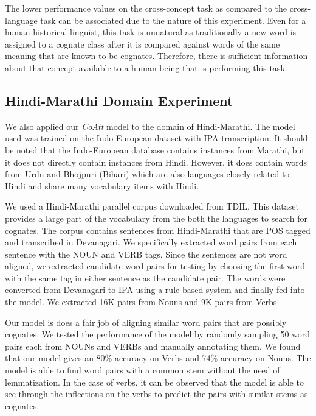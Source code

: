 \documentclass[11pt,letterpaper]{article}
\begin{document}
The lower performance values on the cross-concept task as compared to the cross-language task can be associated due to the nature of this experiment.  Even for a human historical linguist, this task is unnatural as traditionally a new word is assigned to a cognate class after it is compared against words of the same meaning that are known to be cognates. Therefore, there is sufficient information about that concept available to a human being that is performing this task. 

\subsection{Hindi-Marathi Domain Experiment}

We also applied our \textit{CoAtt} model to the domain of Hindi-Marathi. The model used was trained on the Indo-European dataset with IPA transcription. It should be noted that the Indo-European database contains instances from Marathi, but it does not directly contain instances from Hindi. However, it does contain words from Urdu and Bhojpuri (Bihari) which are also languages closely related to Hindi and share many vocabulary items with Hindi.

We used a Hindi-Marathi parallel corpus downloaded from TDIL. This dataset provides a large part of the vocabulary from the both the languages to search for cognates. The corpus contains sentences from Hindi-Marathi that are POS tagged and transcribed in Devanagari. We specifically extracted word pairs from each sentence with the NOUN and VERB tags. Since the sentences are not word aligned, we extracted candidate word pairs for testing by choosing the first word with the same tag in either sentence as the candidate pair. The words were converted from Devanagari to IPA using a rule-based system and finally fed into the model. We extracted 16K pairs from Nouns and 9K pairs from Verbs.

Our model is does a fair job of aligning similar word pairs that are possibly cognates. We tested the performance of the model by randomly sampling 50 word pairs each from NOUNs and VERBs and manually annotating them. We found that our model gives an 80\% accuracy on Verbs and 74\% accuracy on Nouns. The model is able to find word pairs with a common stem without the need of lemmatization. In the case of verbs, it can be observed that the model is able to see through the inflections on the verbs to predict the pairs with similar stems as cognates. 
\end{document}
